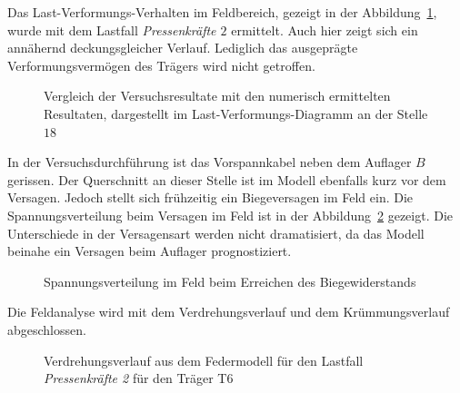 \documentclass[
  11pt,
  letterpaper,
]{scrreprt}
\begin{document}
Das Last-Verformungs-Verhalten im Feldbereich, gezeigt in der
Abbildung~\ref{fig-q_w18_vergleich}, wurde mit dem Lastfall
\emph{Pressenkräfte \(2\)} ermittelt. Auch hier zeigt sich ein annähernd
deckungsgleicher Verlauf. Lediglich das ausgeprägte Verformungsvermögen
des Trägers wird nicht getroffen.

\begin{figure}[H]


\caption{\label{fig-q_w18_vergleich}Vergleich der Versuchsresultate mit
den numerisch ermittelten Resultaten, dargestellt im
Last-Verformungs-Diagramm an der Stelle \(18\)}

\end{figure}%

In der Versuchsdurchführung ist das Vorspannkabel neben dem Auflager
\(B\) gerissen. Der Querschnitt an dieser Stelle ist im Modell ebenfalls
kurz vor dem Versagen. Jedoch stellt sich frühzeitig ein Biegeversagen
im Feld ein. Die Spannungsverteilung beim Versagen im Feld ist in der
Abbildung~\ref{fig-spannungsverteilung_ls12} gezeigt. Die Unterschiede
in der Versagensart werden nicht dramatisiert, da das Modell beinahe ein
Versagen beim Auflager prognostiziert.

\begin{figure}[H]


\caption{\label{fig-spannungsverteilung_ls12}Spannungsverteilung im Feld
beim Erreichen des Biegewiderstands}

\end{figure}%

Die Feldanalyse wird mit dem Verdrehungsverlauf und dem Krümmungsverlauf
abgeschlossen.

\begin{figure}[H]


\caption{\label{fig-phi-t6_l12}Verdrehungsverlauf aus dem Federmodell
für den Lastfall \emph{Pressenkräfte 2} für den Träger T6}

\end{figure}%
\end{document}

